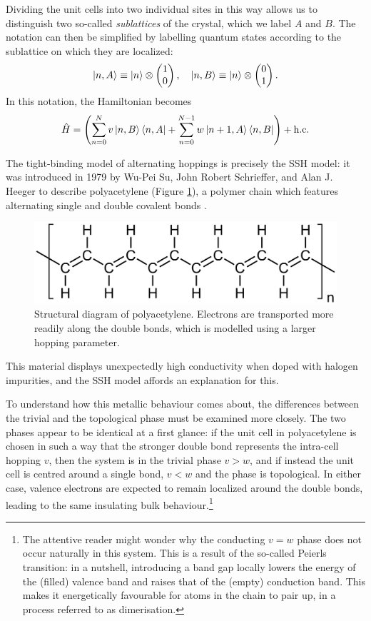 Dividing the unit cells into two individual sites in this way allows us to distinguish two so-called \emph{sublattices} of the crystal, which we label $A$ and $B$. The notation can then be simplified by labelling quantum states according to the sublattice on which they are localized:
\[
	\ket{n,A} \equiv \ket{n}\otimes\begin{pmatrix}
		1 \\ 0
	\end{pmatrix},\quad \ket{n,B} \equiv \ket{n}\otimes\begin{pmatrix}
		0 \\ 1
	\end{pmatrix}.
\]
In this notation, the Hamiltonian becomes
\begin{equation}\label{eq:ssh-sublattice}
	\hat{H} = \left(\sum_{n=0}^{N}v\ket{n,B}\bra{n,A} + \sum_{n=0}^{N-1}w\ket{n+1,A}\bra{n,B}\right) + {\rm h.c.}
\end{equation}

The tight-binding model of alternating hoppings is precisely the SSH model: it was introduced in 1979 by Wu-Pei Su, John Robert Schrieffer, and Alan J. Heeger to describe polyacetylene (Figure \ref{fig:polyacetylene}), a polymer chain which features alternating single and double covalent bonds \cites{SSH_model}{SSH_model2}.
\begin{figure}[htb!]
	\centering
	\includegraphics[width=.8\linewidth]{Images/polyacetylene} %
	\caption{Structural diagram of polyacetylene. Electrons are transported more readily along the double bonds, which is modelled using a larger hopping parameter.}
	\label{fig:polyacetylene}
\end{figure}
This material displays unexpectedly high conductivity when doped with halogen impurities, and the SSH model affords an explanation for this.

To understand how this metallic behaviour comes about, the differences between the trivial and the topological phase must be examined more closely. The two phases appear to be identical at a first glance: if the unit cell in polyacetylene is chosen in such a way that the stronger double bond represents the intra-cell hopping $v$, then the system is in the trivial phase $v>w$, and if instead the unit cell is centred around a single bond, $v<w$ and the phase is topological. In either case, valence electrons are expected to remain localized around the double bonds, leading to the same insulating bulk behaviour.\footnote{
	The attentive reader might wonder why the conducting $v=w$ phase does not occur naturally in this system. This is a result of the so-called Peierls transition: in a nutshell, introducing a band gap locally lowers the energy of the (filled) valence band and raises that of the (empty) conduction band. This makes it energetically favourable for atoms in the chain to pair up, in a process referred to as dimerisation.}

